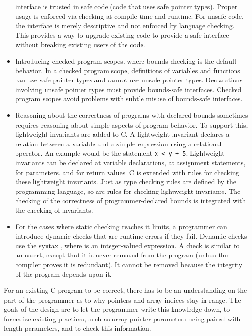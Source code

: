 \begin{itemize}
  interface is trusted in safe code (code that uses safe pointer types).
  Proper usage is enforced via checking at compile time and runtime. For
  unsafe code, the interface is merely descriptive and not enforced by
  language checking. This provides a way to upgrade existing code to
  provide a safe interface without breaking existing users of the code.
\item
  Introducing checked program scopes, where bounds checking is the
  default behavior. In a checked program scope, definitions of variables
  and functions can use safe pointer types and cannot use unsafe pointer
  types. Declarations involving unsafe pointer types must provide
  bounds-safe interfaces. Checked program scopes avoid problems with
  subtle misuse of bounds-safe interfaces.
\item
  Reasoning about the correctness of programs with declared bounds
  sometimes requires reasoning about simple aspects of program behavior.
  To support this, lightweight invariants are added to C. A lightweight
  invariant declares a relation between a variable and a simple
  expression using a relational operator. An example would be the
  statement \texttt{x < y + 5}. Lightweight invariants can be
  declared at variable declarations, at assignment statements, for
  parameters, and for return values. C is extended with rules for
  checking these lightweight invariants. Just as type checking rules are
  defined by the programming language, so are rules for checking
  lightweight invariants. The checking of the correctness of
  programmer-declared bounds is integrated with the checking of
  invariants.
\item
  For the cases where static checking reaches it limits, a programmer
  can introduce dynamic checks that are runtime errors if they fail.
  Dynamic checks use the syntax  , where  is an
  integer-valued expression. A check is similar to an assert, except
  that it is never removed from the program (unless the compiler proves
  it is redundant). It cannot be removed because the integrity of the
  program depends upon it.
\end{itemize}

For an existing C program to be correct, there has to be an
understanding on the part of the programmer as to why pointers and array
indices stay in range. The goals of the design are to let the programmer
write this knowledge down, to formalize existing practices, such as
array pointer parameters being paired with length parameters, and to
check this information.

